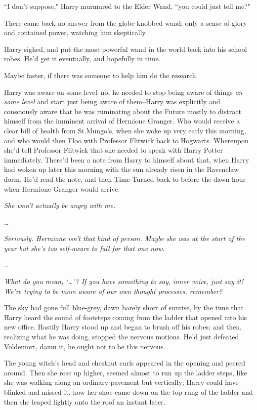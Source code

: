 ``I don't suppose," Harry murmured to the Elder Wand, ``you could just tell me?"

There came back no answer from the globe-knobbed wand; only a sense of glory and contained power, watching him skeptically.

Harry sighed, and put the most powerful wand in the world back into his school robes. He'd get it eventually, and hopefully in time.

Maybe faster, if there was someone to help him do the research.

Harry was aware on some level\---no, he needed to stop being aware of things \emph{on some level} and start just being aware of them\---Harry was explicitly and consciously aware that he was ruminating about the Future mostly to distract himself from the imminent arrival of Hermione Granger. Who would receive a clear bill of health from St.\?Mungo's, when she woke up very early this morning, and who would then Floo with Professor Flitwick back to Hogwarts. Whereupon she'd tell Professor Flitwick that she needed to speak with Harry Potter immediately. There'd been a note from Harry to himself about that, when Harry had woken up later this morning with the sun already risen in the Ravenclaw dorm. He'd read the note, and then Time-Turned back to before the dawn hour when Hermione Granger would arrive.

\emph{She won't actually be angry with me.}

{\ldots}

\emph{Seriously. Hermione isn't that kind of person. Maybe she was at the start of the year but she's too self-aware to fall for that one now.}

{\ldots}

\emph{What do you mean, `{\ldots}'? If you have something to say, inner voice, just say it! We're trying to be more aware of our own thought processes, remember?}

\later

The sky had gone full blue-grey, dawn barely short of sunrise, by the time that Harry heard the sound of footsteps coming from the ladder that opened into his new office. Hastily Harry stood up and began to brush off his robes; and then, realizing what he was doing, stopped the nervous motions. He'd just defeated Voldemort, damn it, he ought not to be this nervous.

The young witch's head and chestnut curls appeared in the opening and peered around. Then she rose up higher, seemed almost to run up the ladder steps, like she was walking along an ordinary pavement but vertically; Harry could have blinked and missed it, how her shoe came down on the top rung of the ladder and then she leaped lightly onto the roof an instant later.

